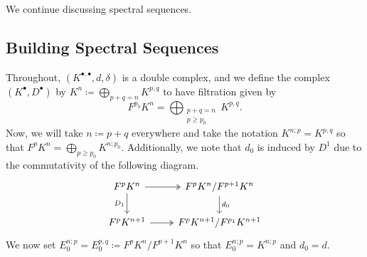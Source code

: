 \documentclass[../notes.tex]{subfiles}
\begin{document}
We continue discussing spectral sequences.

\subsection{Building Spectral Sequences}
Throughout, $(K^{\bullet,\bullet},d,\delta)$ is a double complex, and we define the complex $(K^\bullet,D^\bullet)$ by $K^n\coloneqq\bigoplus_{p+q=n}K^{p,q}$ to have filtration given by
\[F^{p_0}K^n=\bigoplus_{\substack{p+q=n\\p\ge p_0}}K^{p,q}.\]
Now, we will take $n\coloneqq p+q$ everywhere and take the notation $K^{n;p}=K^{p,q}$ so that $F^pK^n=\bigoplus_{p\ge p_0}K^{n;p_0}$. Additionally, we note that $d_0$ is induced by $D^1$ due to the commutativity of the following diagram.
\[\begin{tikzcd}
	{F^pK^n} & {F^pK^n/F^{p+1}K^n} \\
	{F^pK^{n+1}} & {F^pK^{n+1}/F^{p_1}K^{n+1}}
	\arrow[two heads, from=1-1, to=1-2]
	\arrow["{D_1}"', from=1-1, to=2-1]
	\arrow["{d_0}", from=1-2, to=2-2]
	\arrow[two heads, from=2-1, to=2-2]
\end{tikzcd}\]
We now set $E_0^{n;p}=E_0^{p,q}\coloneqq F^pK^n/F^{p+1}K^n$ so that $E_0^{n;p}=K^{n;p}$ and $d_0=d$.
\end{document}
